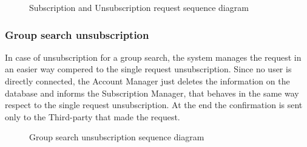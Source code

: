 \begin{figure}[H]
    \centering
    \caption{Subscription and Unsubscription request sequence diagram}
    \label{fig:log&regDiagram}
\end{figure}

\subsubsection{Group search unsubscription}
In case of unsubscription for a group search, the system manages the request in an easier way compered to the single request unsubscription. Since no user is directly connected, the Account Manager just deletes the information on the database and informs the Subscription Manager, that behaves in the same way respect to the single request unsubscription.
At the end the confirmation is sent only to the Third-party that made the request.

\begin{figure}[H]
    \centering
    \caption{Group search unsubscription sequence diagram}
    \label{fig:log&regDiagram}
\end{figure}

